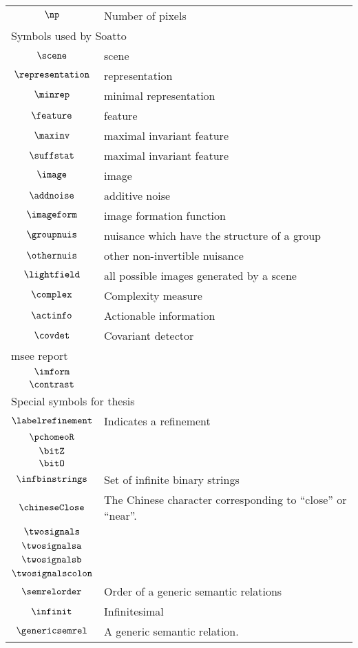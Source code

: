 \begin{longtable}{cl}
 $\np$ &  Number of pixels\\ 
 \multicolumn{2}{l}{Symbols used by Soatto}\\ 
 \hline
$\scene$ &  scene\\ 
 $\representation$ &  representation\\ 
 $\minrep$ &  minimal representation\\ 
 $\feature$ &  feature\\ 
 $\maxinv$ &  maximal invariant feature\\ 
 $\suffstat$ &  maximal invariant feature\\ 
 $\image$ &  image\\ 
 $\addnoise$ &  additive noise\\ 
 $\imageform$ &  image formation function\\ 
 $\groupnuis$ &  nuisance which have the structure of a group\\ 
 $\othernuis$ &  other non-invertible nuisance\\ 
 $\lightfield$ &  all possible images generated by a scene\\ 
 $\complex$ &  Complexity measure\\ 
 $\actinfo$ &  Actionable information\\ 
 $\covdet$ &  Covariant detector\\ 
 \multicolumn{2}{l}{msee report}\\ 
 \hline
$\imform$ & \\ 
 $\contrast$ & \\ 
 \multicolumn{2}{l}{Special symbols for thesis}\\ 
 \hline
$\labelrefinement$ &  Indicates a refinement\\ 
 $\pchomeoR$ & \\ 
 $\bitZ$ & \\ 
 $\bitO$ & \\ 
 $\infbinstrings$ &  Set of infinite binary strings\\ 
 $\chineseClose$ &  The Chinese character corresponding to ``close'' or ``near''. \\ 
 $\twosignals$ & \\ 
 $\twosignalsa$ & \\ 
 $\twosignalsb$ & \\ 
 $\twosignalscolon$ & \\ 
 $\semrelorder$ &  Order of a generic semantic relations\\ 
 $\infinit$ &  Infinitesimal\\ 
 $\genericsemrel$ &  A generic semantic relation.\\ 

\end{longtable}
